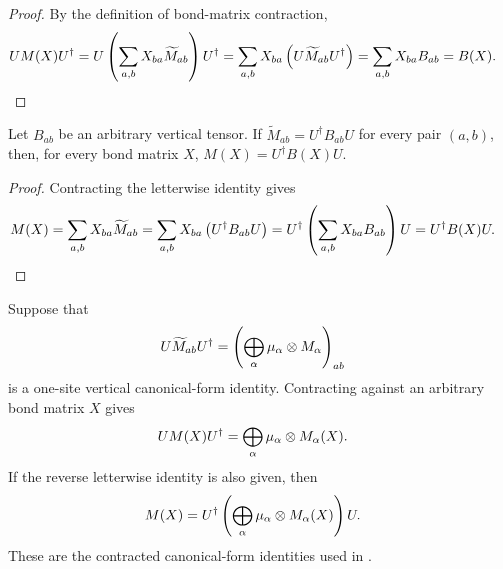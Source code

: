 \begin{proof}\leanok
    By the definition of bond-matrix contraction,
    \begin{align}
        U M(X)U^\dagger
         & =U\left(\sum_{a,b}X_{ba}\widetilde M_{ab}\right)U^\dagger
        =\sum_{a,b}X_{ba}
        \left(U\widetilde M_{ab}U^\dagger\right)
        =\sum_{a,b}X_{ba}B_{ab}
        =B(X).
        \notag
    \end{align}
\end{proof}

\begin{lemma}
    \label{lem:mpdo_vertical_bond_contraction_reconstruction}
    \leanok
    Let $B_{ab}$ be an arbitrary vertical tensor. If
    $\widetilde M_{ab}=U^\dagger B_{ab}U$ for every pair $(a,b)$, then, for
    every bond matrix $X$, $M(X)=U^\dagger B(X)U$.
\end{lemma}

\begin{proof}\leanok
    Contracting the letterwise identity gives
    \begin{align}
        M(X)
         & =\sum_{a,b}X_{ba}\widetilde M_{ab}
        =\sum_{a,b}X_{ba}\left(U^\dagger B_{ab}U\right)
        =U^\dagger\left(\sum_{a,b}X_{ba}B_{ab}\right)U
        =U^\dagger B(X)U.
        \notag
    \end{align}
\end{proof}

\begin{lemma}
    \label{lem:mpdo_vertical_bond_matrix_contraction}
    \leanok
    Suppose that
    \begin{align}
        U\widetilde M_{ab}U^\dagger
         & =\left(\bigoplus_\alpha\mu_\alpha\otimes M_\alpha\right)_{ab}
        \notag
    \end{align}
    is a one-site vertical canonical-form identity. Contracting against an
    arbitrary bond matrix $X$ gives
    \begin{align}
        U M(X)U^\dagger
         & =\bigoplus_\alpha\mu_\alpha\otimes M_\alpha(X).
        \notag
    \end{align}
    If the reverse letterwise identity is also given, then
    \begin{align}
        M(X)
         & =U^\dagger
        \left(\bigoplus_\alpha\mu_\alpha\otimes M_\alpha(X)\right)U.
        \notag
    \end{align}
    These are the contracted canonical-form identities used in
    \cite[Appendix~C.4, lines~1955--1979]{Cirac2016MPDO_arXiv}.
\end{lemma}

